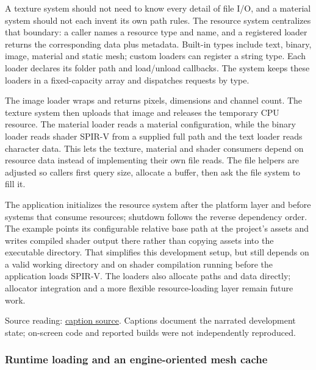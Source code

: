 \hypertarget{06-engine-ii-ch027-loading-different-asset-types-through-resource-loaders}{}

A texture system should not need to know every detail of file I/O, and a material system should not each invent its own path rules. The resource system centralizes that boundary: a caller names a resource type and name, and a registered loader returns the corresponding data plus metadata. Built-in types include text, binary, image, material and static mesh; custom loaders can register a string type. Each loader declares its folder path and load/unload callbacks. The system keeps these loaders in a fixed-capacity array and dispatches requests by type.

The image loader wraps  and returns pixels, dimensions and channel count. The texture system then uploads that image and releases the temporary CPU resource. The material loader reads a material configuration, while the binary loader reads shader SPIR-V from a supplied full path and the text loader reads character data. This lets the texture, material and shader consumers depend on resource data instead of implementing their own file reads. The file helpers are adjusted so callers first query size, allocate a buffer, then ask the file system to fill it.

The application initializes the resource system after the platform layer and before systems that consume resources; shutdown follows the reverse dependency order. The example points its configurable relative base path at the project's assets and writes compiled shader output there rather than copying assets into the executable directory. That simplifies this development setup, but still depends on a valid working directory and on shader compilation running before the application loads SPIR-V. The loaders also allocate paths and data directly; allocator integration and a more flexible resource-loading layer remain future work.

Source reading: \href{https://www.youtube.com/watch?v=ubin1HH_kqw}{caption source}. Captions document the narrated development state; on-screen code and reported builds were not independently reproduced.

\subsubsection{Runtime loading and an engine-oriented mesh cache}\label{06-engine-ii-ch027-runtime-loading-and-an-engine-oriented-mesh-cache}

